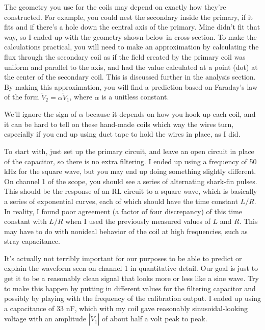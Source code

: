 The geometry you use for the coils may depend on exactly how they're constructed.
For example, you could nest the secondary inside the primary, if it fits
and if there's a hole down the central axis of the primary. Mine didn't
fit that way, so I ended up with the geometry shown below in cross-section. To make the
calculations practical, you will need to make an approximation by
calculating the flux through the secondary coil as if the field created by
the primary coil was uniform and parallel to the axis, and had the value
calculated at a point (dot) at the center of the secondary coil. This is
discussed further in the analysis section. By making this approximation,
you will find a prediction based on Faraday's law of the form $\tilde{V}_2=\alpha \tilde{V}_1$,
where $\alpha$ is a unitless constant. 


We'll ignore the sign of $\alpha$ because
it depends on how you hook up each coil, and it can be hard to tell on these hand-made
coils which way the wires turn, especially if you end up using duct tape to hold the
wires in place, as I did.

\observations

To start with,  just set up the primary circuit, and leave an open circuit
in place of the capacitor, so there is no extra filtering. I ended up using
a frequency of 50 kHz for the square wave, but you may end up doing something
slightly different. On channel 1 of the scope, you should see a series of
alternating shark-fin pulses. This should be the response of an RL circuit
to a square wave, which is basically a series of exponential curves, each
of which should have the time constant $L/R$. In reality, I found poor
agreement (a factor of four discrepancy) of this time constant  with $L/R$ when I used the previously
measured values of $L$ and $R$. This may have to do with nonideal behavior of
the coil at high frequencies, such as stray capacitance.

It's actually not terribly
important for our purposes to be able to predict or explain the waveform seen on channel
1 in quantitative detail. Our goal is just to get it to be a reasonably clean signal
that looks more or less like a sine wave. Try to make this happen by putting in
different values for the filtering capacitor and possibly by playing with the
frequency of the calibration output. I ended up using a capacitance of 33 nF,
which with my coil gave reasonably sinusoidal-looking voltage with an amplitude
$|\tilde{V}_1|$ of about half a volt peak to peak.

